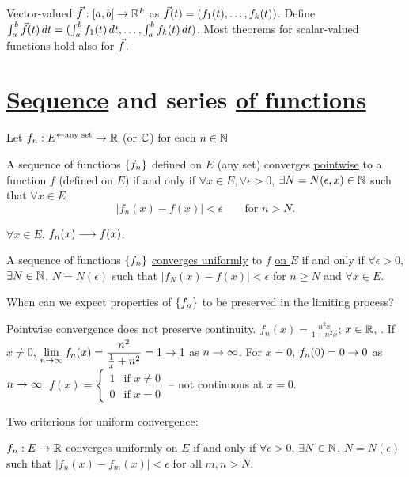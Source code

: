 \documentclass[]{article}
\begin{document}
Vector-valued
	$\vec{f}:[a,b]\rightarrow\mathbb{R}^k$ as
	$\vec{f}(t) = (f_1(t),\dots,f_k(t))$.
Define $\int_a^b \vec{f}(t)\,dt = (\int_a^bf_1(t)\,dt,\dots,\int_a^bf_k(t)\,dt)$.
Most theorems for scalar-valued functions hold also for $\vec{f}$.

\section*{\ul{Sequence} and series \ul{of functions}}

Let $f_n:E^{\leftarrow\text{any set}}\rightarrow\mathbb{R}$ (or $\mathbb{C}$) for each $n\in\mathbb{N}$
\begin{definition}
	A sequence of functions $\left\{ f_n \right\}$ defined on $E$ (any set) converges \ul{pointwise} to a function $f$ (defined on $E$) if and only if $\forall x\in E,\forall\epsilon>0$, $\exists N=N(\epsilon,x)\in\mathbb{N}$ such that $\forall x\in E$
	$$ |f_n(x)-f(x)| < \epsilon \qquad \text{for }n>N. $$
\end{definition}
\begin{remark}
	$\forall x\in E$, $f_n(x)\longrightarrow f(x)$.
\end{remark}
\begin{definition}
	A sequence of functions $\left\{ f_n \right\}$ \ul{converges uniformly} to $f$ \ul{on $E$} if and only if $\forall\epsilon>0$, $\exists N\in\mathbb{N}$, $N=N(\epsilon)$ such that $|f_N(x)-f(x)| < \epsilon$ for $n\geq N$ and $\forall x\in E$.
\end{definition}
When can we expect properties of $\left\{ f_n \right\}$ to be preserved in the limiting process?
\begin{example}
	Pointwise convergence does not preserve continuity.
	$f_n(x) = \frac{n^2x}{1+n^2x}$; $x\in\mathbb{R}$, .
	If $x\neq0$, $\displaystyle\lim_{n\rightarrow\infty} f_n(x) = \frac{n^2}{\frac1x+n^2} = 1\rightarrow 1$ as $n\rightarrow\infty$.
	For $x=0$, $f_n(0)=0\rightarrow0$ as $n\rightarrow\infty$.
	$f(x) = \begin{cases} 1 & \text{if }x\neq0 \\ 0 & \text{if }x=0 \end{cases}$ -- not continuous at $x=0$.
\end{example}

Two criterions for uniform convergence:
\begin{theorem}
	\label{thm-7-8}
	$f_n:E\rightarrow\mathbb{R}$ converges uniformly on $E$ if and only if $\forall\epsilon>0$, $\exists N\in\mathbb{N}$, $N=N(\epsilon)$ such that $|f_n(x)-f_m(x)|<\epsilon$ for all $m,n> N$.
\end{theorem}
\end{document}

